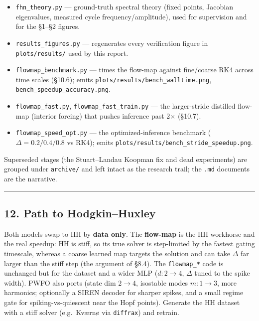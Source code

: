 \documentclass[
  11pt,
]{article}
\begin{document}
\begin{itemize}
  arbitrary-far-\(t\), slow currents).
\item
  \texttt{fhn\_theory.py} --- ground-truth spectral theory (fixed
  points, Jacobian eigenvalues, measured cycle frequency/amplitude),
  used for supervision and for the §1--§2 figures.
\item
  \texttt{results\_figures.py} --- regenerates every verification figure
  in \texttt{plots/results/} used by this report.
\item
  \texttt{flowmap\_benchmark.py} --- times the flow-map against
  fine/coarse RK4 across time scales (§10.6); emits
  \texttt{plots/results/bench\_walltime.png},
  \texttt{bench\_speedup\_accuracy.png}.
\item
  \texttt{flowmap\_fast.py}, \texttt{flowmap\_fast\_train.py} --- the
  larger-stride distilled flow-map (interior forcing) that pushes
  inference past 2× (§10.7).
\item
  \texttt{flowmap\_speed\_opt.py} --- the optimized-inference benchmark
  (\(\Delta=0.2/0.4/0.8\) vs RK4); emits
  \texttt{plots/results/bench\_stride\_speedup.png}.
\end{itemize}

Superseded stages (the Stuart--Landau Koopman fix and dead experiments)
are grouped under \texttt{archive/} and left intact as the research
trail; the \texttt{.md} documents are the narrative.

\begin{center}\rule{0.5\linewidth}{0.5pt}\end{center}

\subsection{12. Path to Hodgkin--Huxley}\label{path-to-hodgkinhuxley}

Both models swap to HH by \textbf{data only}. The \textbf{flow-map} is
the HH workhorse and the real speedup: HH is stiff, so its true solver
is step-limited by the fastest gating timescale, whereas a coarse
learned map targets the solution and can take \(\Delta\) far larger than
the stiff step (the argument of §8.4). The \texttt{flowmap\_*} code is
unchanged but for the dataset and a wider MLP (\(d:2\to4\), \(\Delta\)
tuned to the spike width). PWFO also ports (state dim \(2\to4\),
isostable modes \(m:1\to3\), more harmonics; optionally a SIREN decoder
for sharper spikes, and a small regime gate for spiking-vs-quiescent
near the Hopf points). Generate the HH dataset with a stiff solver
(e.g.~Kværnø via \texttt{diffrax}) and retrain.
\end{document}
